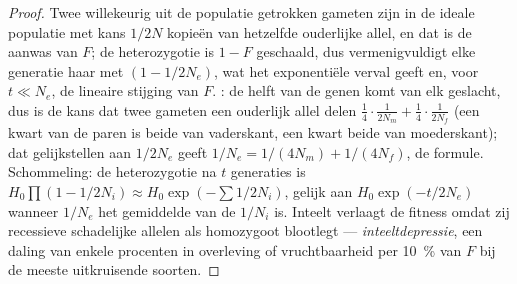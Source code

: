 \begin{proof}
Twee willekeurig uit de populatie getrokken gameten zijn in de ideale
populatie met kans $1/2N$ kopieën van hetzelfde ouderlijke allel, en
dat is de aanwas van $F$; de heterozygotie is $1 - F$ geschaald, dus
vermenigvuldigt elke generatie haar met $(1 - 1/2N_{e})$, wat het
exponentiële verval geeft en, voor $t \ll N_{e}$, de lineaire stijging
van $F$. : de helft van de genen komt van elk
geslacht, dus is de kans dat twee gameten een ouderlijk allel delen
$\tfrac{1}{4}\cdot\tfrac{1}{2N_{m}} +
\tfrac{1}{4}\cdot\tfrac{1}{2N_{f}}$ (een kwart van de paren is beide
van vaderskant, een kwart beide van moederskant); dat gelijkstellen aan
$1/2N_{e}$ geeft $1/N_{e} = 1/(4N_{m}) + 1/(4N_{f})$, de formule.
Schommeling: de heterozygotie na $t$ generaties is $H_{0}\prod(1 - 1/2N_{i})
\approx H_{0}\exp(-\sum 1/2N_{i})$, gelijk aan $H_{0}\exp(-t/2N_{e})$
wanneer $1/N_{e}$ het gemiddelde van de $1/N_{i}$ is. Inteelt verlaagt
de fitness omdat zij recessieve schadelijke allelen als homozygoot
blootlegt --- \emph{inteeltdepressie}, een daling van enkele procenten
in overleving of vruchtbaarheid per \qty{10}{\%} van $F$ bij de meeste
uitkruisende soorten.
\end{proof}

